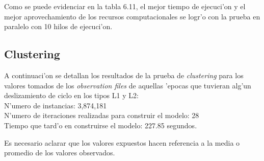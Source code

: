 Como se puede evidenciar en la tabla 6.11, el mejor tiempo de ejecuci'on y el mejor aprovechamiento de los recursos computacionales se logr'o con la prueba en paralelo con 10 hilos de ejecuci'on.\\

\subsection{Clustering}
\noindent
A continuaci'on se detallan los resultados de la prueba de \emph{clustering} para los valores tomados de los \emph{observation files} de aquellas 'epocas que tuvieran alg'un deslizamiento de ciclo en los tipos L1 y L2:\\

N'umero de instancias: 3,874,181\\
N'umero de iteraciones realizadas para construir el modelo: 28\\
Tiempo que tard'o en construirse el modelo: 227.85 segundos.\\

\begin{table}[H]
\begin{center}
\end{center}
\caption{Resultados \emph{clustering} centroides}
\end{table}

Es necesario aclarar que los valores expuestos hacen referencia a la media o promedio de los valores observados.\\

